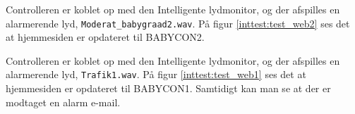 
Controlleren er koblet op med den Intelligente lydmonitor, og der afspilles en alarmerende lyd, \verb+Moderat_babygraad2.wav+. På figur \ref{inttest:test_web2} ses det at hjemmesiden er opdateret til BABYCON2.


Controlleren er koblet op med den Intelligente lydmonitor, og der afspilles en alarmerende lyd, \verb+Trafik1.wav+. På figur \ref{inttest:test_web1} ses det at hjemmesiden er opdateret til BABYCON1. Samtidigt kan man se at der er modtaget en alarm e-mail.

